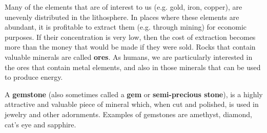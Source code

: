 Many of the elements that are of interest to us (e.g.\@{} gold, iron, copper), are unevenly distributed in the lithosphere. In places where these elements are abundant, it is profitable to extract them (e.g.\@{} through mining) for economic purposes. If their concentration is very low, then the cost of extraction becomes more than the money that would be made if they were sold. Rocks that contain valuable minerals are called \textbf{ores}. As humans, we are particularly interested in the ores that contain metal elements, and also in those minerals that can be used to produce energy.


\begin{IFact}{
A \textbf{gemstone} (also sometimes called a \textbf{gem} or \textbf{semi-precious stone}), is a highly attractive and valuable piece of mineral which, when cut and polished, is used in jewelry and other adornments. Examples of gemstones are amethyst, diamond, cat's eye and sapphire.
}
\end{IFact}





